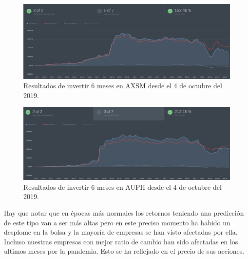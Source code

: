 \documentclass[10pt,a4paper,twocolumn]{article}
\begin{document}
	\begin{figure}
		\centering
		\includegraphics[width=1\linewidth]{AXSM}
		\caption{Resultados de invertir 6 meses en AXSM desde el 4 de octubre del 2019.}
		\label{fig:axsm}
	\end{figure}
	\begin{figure}
		\centering
		\includegraphics[width=1\linewidth]{auph}
		\caption{Resultados de invertir 6 meses en AUPH desde el 4 de octubre del 2019.}
		\label{fig:auph}
	\end{figure}
	Hay que notar que en épocas más normales los retornos teniendo una predicción de este tipo van a ser más altas pero en este preciso momento ha habido un desplome en la bolsa y la mayoría de empresas se han visto afectadas por ella. Incluso nuestras empresas con mejor ratio de cambio han sido afectadas en los ultimos meses por la pandemia. Esto se ha reflejado en el precio de sus acciones. 
		
	
\end{document}
